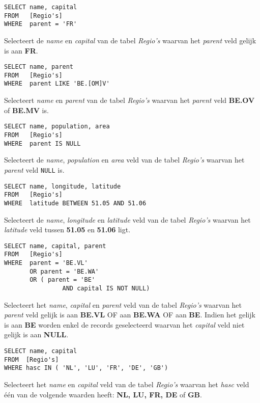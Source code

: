 \documentclass[12pt]{report}
\newcommand{\sepline}{ \noindent{\rule{\linewidth}{0.4pt}}}
\begin{document}
\sepline

\begin{verbatim}
SELECT name, capital
FROM   [Regio's]
WHERE  parent = 'FR'
\end{verbatim}
Selecteert de \textit{name} en \textit{capital} van de tabel \textit{Regio's} waarvan het \textit{parent} veld gelijk is aan \textbf{FR}.

\sepline

\begin{verbatim}
SELECT name, parent
FROM   [Regio's]
WHERE  parent LIKE 'BE.[OM]V'
\end{verbatim}
Selecteert \textit{name} en \textit{parent} van de tabel \textit{Regio's} waarvan het \textit{parent} veld \textbf{BE.OV} of \textbf{BE.MV} is.

\sepline

\begin{verbatim}
SELECT name, population, area
FROM   [Regio's]
WHERE  parent IS NULL
\end{verbatim}
Selecteert de \textit{name}, \textit{population} en \textit{area} veld van de tabel \textit{Regio's} waarvan het \textit{parent} veld \texttt{NULL} is.

\sepline

\begin{verbatim}
SELECT name, longitude, latitude
FROM   [Regio's]
WHERE  latitude BETWEEN 51.05 AND 51.06
\end{verbatim}
Selecteert de \textit{name}, \textit{longitude} en \textit{latitude} veld van de tabel \textit{Regio's} waarvan het \textit{latitude} veld tussen 
\textbf{51.05} en \textbf{51.06} ligt.

\sepline

\begin{verbatim}
SELECT name, capital, parent
FROM   [Regio's]
WHERE  parent = 'BE.VL'
       OR parent = 'BE.WA'
       OR ( parent = 'BE'
	            AND capital IS NOT NULL)
\end{verbatim}
Selecteert het \textit{name}, \textit{capital} en \textit{parent} veld van de tabel \textit{Regio's} waarvan het \textit{parent} veld gelijk is aan 
\textbf{BE.VL} OF aan \textbf{BE.WA} OF aan \textbf{BE}. Indien het gelijk is aan \textbf{BE} worden enkel de records geselecteerd waarvan het \textit{capital}
veld niet gelijk is aan \textbf{NULL}.

\sepline

\begin{verbatim}
SELECT name, capital
FROM  [Regio's]
WHERE hasc IN ( 'NL', 'LU', 'FR', 'DE', 'GB')
\end{verbatim}
Selecteert het \textit{name} en \textit{capital} veld van de tabel \textit{Regio's} waarvan het \textit{hasc} veld één van de volgende waarden heeft:
\textbf{NL, LU, FR, DE} of \textbf{GB}.
\end{document}
